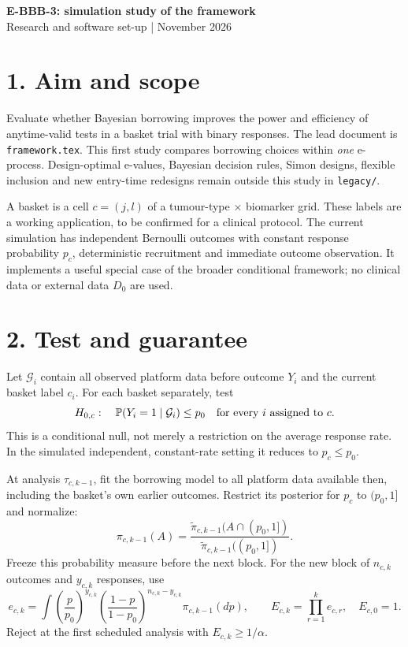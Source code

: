 \documentclass[10pt,a4paper]{article}
\newcommand{\Prob}{\mathbb P}
\begin{document}
\begin{center}
{\Large\bfseries E-BBB-3: simulation study of the framework}\\[4pt]
{\small Research and software set-up \enspace| November 2026}
\end{center}
\vspace{-0.5em}

\section*{1. Aim and scope}
Evaluate whether Bayesian borrowing improves the power and efficiency of
anytime-valid tests in a basket trial with binary responses. The lead
document is \texttt{framework.tex}. This first study compares borrowing
choices within \emph{one} e-process. Design-optimal e-values, Bayesian
decision rules, Simon designs, flexible inclusion and new entry-time
redesigns remain outside this study in \texttt{legacy/}.

A basket is a cell $c=(j,l)$ of a tumour-type $\times$ biomarker grid.
These labels are a working application, to be confirmed for a clinical
protocol. The current simulation has independent Bernoulli outcomes with
constant response probability $p_c$, deterministic recruitment and immediate
outcome observation. It implements a useful special case of the broader
conditional framework; no clinical data or external data $D_0$ are used.

\section*{2. Test and guarantee}
Let $\mathcal G_i$ contain all observed platform data before outcome $Y_i$
and the current basket label $c_i$. For each basket separately, test
\[
 H_{0,c}:\quad \Prob(Y_i=1\mid\mathcal G_i)\le p_0
 \quad\hbox{for every }i\hbox{ assigned to }c.
\]
This is a conditional null, not merely a restriction on the average response
rate. In the simulated independent, constant-rate setting it reduces to
$p_c\le p_0$.

At analysis $\tau_{c,k-1}$, fit the borrowing model to all platform data
available then, including the basket's own earlier outcomes. Restrict its
posterior for $p_c$ to $(p_0,1]$ and normalize:
\[
 \pi_{c,k-1}(A)=
 \frac{\widetilde\pi_{c,k-1}(A\cap(p_0,1])}
      {\widetilde\pi_{c,k-1}((p_0,1])}.
\]
Freeze this probability measure before the next block. For the new block
of $n_{c,k}$ outcomes and $y_{c,k}$ responses, use
\[
 e_{c,k}=\int
 \left(\frac p{p_0}\right)^{y_{c,k}}
 \left(\frac{1-p}{1-p_0}\right)^{n_{c,k}-y_{c,k}}
 \pi_{c,k-1}(dp),\qquad
 E_{c,k}=\prod_{r=1}^k e_{c,r},\quad E_{c,0}=1.
\]
Reject at the first scheduled analysis with $E_{c,k}\ge 1/\alpha$.
\end{document}
